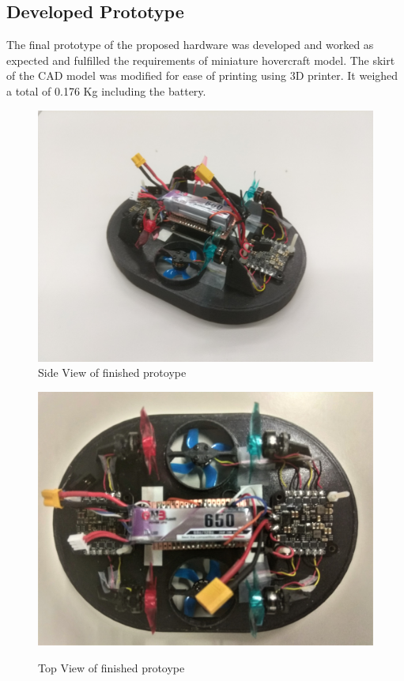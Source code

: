 \documentclass[12pt,titlepage]{article}
\begin{document}
\subsection{Developed Prototype}
The final prototype of the proposed hardware was developed and worked as expected and fulfilled the requirements of miniature hovercraft model. The skirt of the CAD model was modified for ease of printing using 3D printer. It weighed a total of 0.176 Kg including the battery. 
\begin{figure}[H]
    \centering
\begin{minipage}{.5\textwidth}
  \centering
    \includegraphics[width=0.9\columnwidth]{Images/sideview_hov.jpg}\\
    \caption{Side View of finished protoype}
    \label{fig:proto_1}
    \end{minipage}%
\begin{minipage}{.5\textwidth}
  \centering
    \includegraphics[width=0.9\columnwidth]{Images/topview_hov.jpg}\\
    \caption{Top View of finished protoype}
    \label{fig:proto_2}
    \end{minipage}%
\end{figure}
\end{document}
